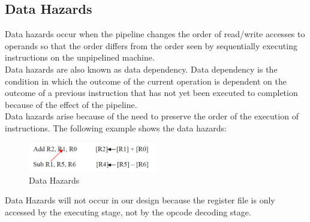 \documentclass[12pt,a4paper]{report}
\begin{document}
\subsection{Data Hazards}
Data hazards occur when the pipeline changes the order of read/write accesses to operands so that the order differs from the order seen by sequentially executing instructions on the unpipelined machine. \\
Data hazards are also known as data dependency. Data dependency is the condition in which the outcome of the current operation is dependent on the outcome of a previous instruction that has not yet been executed to completion because of the effect of the pipeline. \\
Data hazards arise because of the need to preserve the order of the execution of instructions.
The following example shows the data hazards:
\begin{figure}[h]
  \centering
  \includegraphics[width=0.5\textwidth]{DH}
  \caption{Data Hazards}
  \label{fig:dh}
\end{figure}
Data Hazards will not occur in our design because the register file is only accessed by the executing stage, not by the opcode decoding stage.
\end{document}
